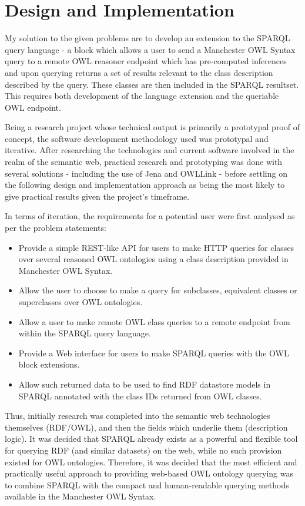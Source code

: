 \documentclass{article}
\begin{document}
\section{Design and Implementation}

My solution to the given problems are to develop an extension to the SPARQL
query language - a block which allows a user to send a Manchester OWL Syntax query to a
remote OWL reasoner endpoint which has pre-computed inferences and upon querying
returns a set of results relevant to the class description described by the
query. These classes are then included in the SPARQL resultset. This requires 
both development of the language extension and the queriable OWL endpoint.

Being a research project whose technical output is primarily a prototypal proof
of concept, the software development methodology used was prototypal and
iterative. After researching the technologies and current software involved in
the realm of the semantic web, practical research and prototyping was done with 
several solutions - including the use of Jena and OWLLink - before settling on
the following design and implementation approach as being the most likely to
give practical results given the project's timeframe.

In terms of iteration, the requirements for a potential user were first analysed 
as per the problem statements:

\begin{itemize}
    \item Provide a simple REST-like API for users to make HTTP queries for
    classes over several reasoned OWL ontologies using a class description
    provided in Manchester OWL Syntax.
    \item Allow the user to choose to make a query for subclasses, equivalent
    classes or superclasses over OWL ontologies.
    \item Allow a user to make remote OWL class queries to a remote endpoint from 
    within the SPARQL query language.
    \item Provide a Web interface for users to make SPARQL queries with the OWL
    block extensions.
    \item Allow such returned data to be used to find RDF datastore models in 
    SPARQL annotated with the class IDs returned from OWL classes.
\end{itemize}

Thus, initially research was completed into the semantic web technologies
themselves (RDF/OWL), and then the fields which underlie them (description
logic). It was decided that SPARQL already exists as a powerful and flexible
tool for querying RDF (and similar datasets) on the web, while no such provision
existed for OWL ontologies. Therefore, it was decided that the most efficient
and practically useful approach to providing web-based OWL ontology querying was
to combine SPARQL with the compact and human-readable querying methods available
in the Manchester OWL Syntax. 
\end{document}
